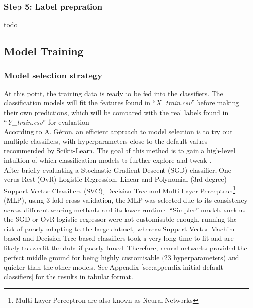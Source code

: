 \documentclass[letterpaper,12pt]{article}
\begin{document}
\subsubsection{Step 5: Label prepration}

todo


\subsection{Model Training}

\subsubsection{Model selection strategy}

At this point, the training data is ready to be fed into the classifiers. The classification models will fit the features found in ``\textit{X\_train.csv}'' before making their own predictions, which will be compared with the real labels found in ``\textit{Y\_train.csv}'' for evaluation.\\

According to A. Géron, an efficient approach to model selection is to try out multiple classifiers, with hyperparameters close to the default values recommended by Scikit-Learn. The goal of this method is to gain a high-level intuition of which classification models to further explore and tweak \cite{Geron2019}.\\

After briefly evaluating a Stochastic Gradient Descent (SGD) classifier, One-verus-Rest (OvR) Logistic Regression, Linear and Polynomial (3rd degree) Support Vector Classifiers (SVC), Decision Tree and Multi Layer Perceptron\footnote{Multi Layer Perceptron are also known as Neural Networks} (MLP), using 3-fold cross validation, the MLP was selected due to its consistency across different scoring methods and its lower runtime. ``Simpler'' models such as the SGD or OvR logistic regressor were not customisable enough, running the risk of poorly adapting to the large dataset, whereas Support  Vector Machine-based and Decision Tree-based classifiers took a very long time to fit and  are likely to overfit the data if poorly tuned. Therefore, neural networks provided the perfect middle ground for being highly customisable (23 hyperparameters) and quicker than the other models. See Appendix \ref{sec:appendix-initial-default-classifiers} for the results in tabular format.
\end{document}
